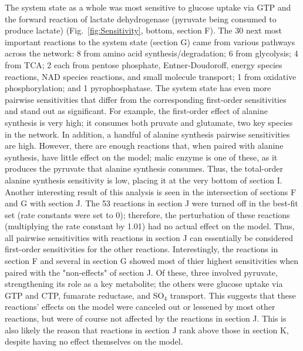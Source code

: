 \documentclass[12pt]{article}
\begin{document}
The system state as a whole was most sensitive to glucose uptake via GTP and the forward reaction of lactate dehydrogenase (pyruvate being consumed to produce lactate) (Fig.~\ref{fig:Sensitivity}, bottom, section F).
The 30 next most important reactions to the system state (section G) came from various pathways across the network: 8 from amino acid synthesis/degradation; 6 from glycolysis; 4 from TCA; 2 each from pentose phosphate, Entner-Doudoroff, energy species reactions, NAD species reactions, and small molecule transport; 1 from oxidative phosphorylation; and 1 pyrophosphatase.
The system state has even more pairwise sensitivities that differ from the corresponding first-order sensitivities and stand out as significant.
For example, the first-order effect of alanine synthesis is very high; it consumes both pruvate and glutamate, two key species in the network.
In addition, a handful of alanine synthesis pairwise sensitivities are high.
However, there are enough reactions that, when paired with alanine synthesis, have little effect on the model; malic enzyme is one of these, as it produces the pyruvate that alanine synthesis consumes.
Thus, the total-order alanine synthesis sensitivity is low, placing it at the very bottom of section I.
Another interesting result of this analysis is seen in the intersection of sections F and G with section J.
The 53 reactions in section J were turned off in the best-fit set (rate constants were set to 0); therefore, the perturbation of these reactions (multiplying the rate constant by 1.01) had no actual effect on the model.
Thus, all pairwise sensitivities with reactions in section J can essentially be considered first-order sensitivities for the other reactions.
Interestingly, the reactions in section F and several in section G showed most of thier highest sensitivities when paired with the "non-effects" of section J.
Of these, three involved pyruvate, strengthening its role as a key metabolite; the others were glucose uptake via GTP and CTP, fumarate reductase, and SO$_4$ transport.
This suggests that these reactions' effects on the model were canceled out or lessened by most other reactions, but were of course not affected by the reactions in section J.
This is also likely the reason that reactions in section J rank above those in section K, despite having no effect themselves on the model.
\end{document}

